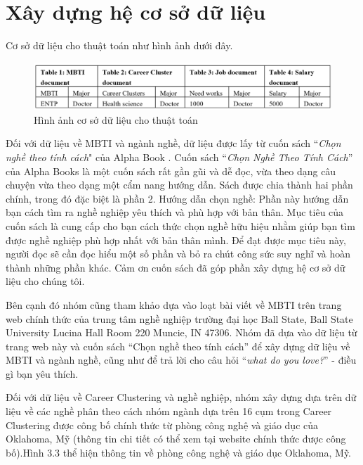 \section{Xây dựng hệ cơ sở dữ liệu}\label{3.1}
Cơ sở dữ liệu cho thuật toán như hình ảnh dưới đây. 

\begin{figure}[H]
        \centering
        \includegraphics[width=0.9\linewidth]{images/data.png}
        \vspace{0.6cm}
        \caption{Hình ảnh cơ sở dữ liệu cho thuật toán}
    \end{figure}

Đối với dữ liệu về MBTI và ngành nghề, dữ liệu được lấy từ cuốn sách ``\textit{Chọn nghề theo tính cách}" của Alpha Book \cite{alpha}. Cuốn sách ``\textit{Chọn Nghề Theo Tính Cách}” của Alpha Books là một cuốn sách rất gần gũi và dễ đọc, vừa theo dạng câu chuyện vừa theo dạng một cẩm nang hướng dẫn. Sách được chia thành hai phần chính, trong đó đặc biệt là phần 2. Hướng dẫn chọn nghề: Phần này hướng dẫn bạn cách tìm ra nghề nghiệp yêu thích và phù hợp với bản thân. Mục tiêu của cuốn sách là cung cấp cho bạn cách thức chọn nghề hữu hiệu nhằm giúp bạn tìm được nghề nghiệp phù hợp nhất với bản thân mình. Để đạt được mục tiêu này, người đọc sẽ cần đọc hiểu một số phần và bỏ ra chút công sức suy nghĩ và hoàn thành những phần khác. Cảm ơn cuốn sách đã góp phần xây dựng hệ cơ sở dữ liệu cho chúng tôi. 

Bên cạnh đó nhóm cũng tham khảo dựa vào loạt bài viết về MBTI trên trang web chính thức của trung tâm nghề nghiệp trường đại học Ball State, Ball State University Lucina Hall Room 220 Muncie, IN 47306. Nhóm đã dựa vào dữ liệu từ trang web này và cuốn sách ``Chọn nghề theo tính cách” để xây dựng dữ liệu về MBTI và ngành nghề, cũng như để trả lời cho câu hỏi ``\textit{what do you love?}” - điều gì bạn yêu thích. 

Đối với dữ liệu về Career Clustering và nghề nghiệp, nhóm xây dựng dựa trên dữ liệu về các nghề phân theo cách nhóm ngành dựa trên 16 cụm trong Career Clustering được công bố chính thức từ phòng công nghệ và giáo dục của Oklahoma, Mỹ (thông tin chi tiết có thể xem tại website chính thức được công bố).Hình 3.3 thể hiện thông tin về phòng công nghệ và giáo dục Oklahoma, Mỹ.

